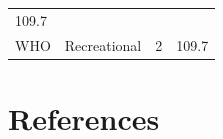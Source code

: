 \documentclass[11pt,]{article}
\begin{document}
\begin{longtable}[c]{@{}llll@{}}
\begin{minipage}[t]{0.17\columnwidth}\raggedright\strut
109.7
\strut\end{minipage}\tabularnewline
\begin{minipage}[t]{0.11\columnwidth}\raggedright\strut
WHO
\strut\end{minipage} &
\begin{minipage}[t]{0.16\columnwidth}\raggedright\strut
Recreational
\strut\end{minipage} &
\begin{minipage}[t]{0.17\columnwidth}\raggedright\strut
2
\strut\end{minipage} &
\begin{minipage}[t]{0.17\columnwidth}\raggedright\strut
109.7
\strut\end{minipage}\tabularnewline
\bottomrule
\end{longtable}

\section*{References}\label{references}
\end{document}
